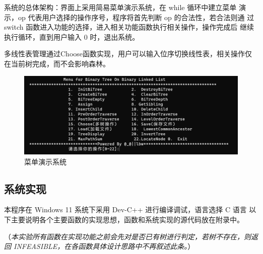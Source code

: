 \documentclass[supercite]{Experimental_Report}
\theoremstyle{definition}
\begin{document}
系统的总体架构：界面上采用简易菜单演示系统，在 while 循环中建立菜单
演示，op 代表用户选择的操作序号，程序将首先判断 op 的合法性，若合法则通
过 switch 函数进入功能的选择，进入相关功能函数执行相关操作，操作完成后
继续执行循环，直到用户输入 0 时，退出系统。

多线性表管理通过Choose函数实现，用户可以输入位序切换线性表，相关操作仅在当前树完成，而不会影响森林。
\begin{figure}[htbp]
	\centering
	\begin{minipage}{0.7\linewidth}
		\centering
		\includegraphics[width=0.9\linewidth]{images/树的菜单设计.png}
	\end{minipage}
	\caption{菜单演示系统}
	\label{fig2-1}
\end{figure}
\subsection{系统实现}
本程序在 Windows 11 系统下采用 Dev-C++ 进行编译调试，语言选择 C 语言
以下主要说明各个主要函数的实现思想，函数和系统实现的源代码放在附录中。

（\emph{本实验所有函数在实现功能之前会先对是否已有树进行判定，若树不存在，则返回 INFEASIBLE，在各函数具体设计思路中不再叙述此条。}）
\end{document}
